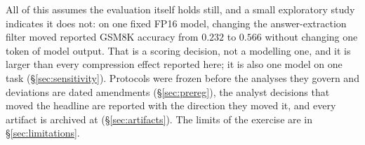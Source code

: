 All of this assumes the evaluation itself holds still, and a small exploratory
study indicates it does not: on one fixed FP16 model, changing the
answer-extraction filter moved reported GSM8K accuracy from $0.232$ to $0.566$
without changing one token of model output. That is a scoring decision, not a
modelling one, and it is larger than every compression effect reported here; it
is also one model on one task (\S\ref{sec:sensitivity}).
Protocols were frozen before the analyses they
govern and deviations are dated amendments (\S\ref{sec:prereg}), the analyst
decisions that moved the headline are reported with the direction they moved it,
and every artifact is archived at \versiondoi{} (\S\ref{sec:artifacts}). The
limits of the exercise are in \S\ref{sec:limitations}.


